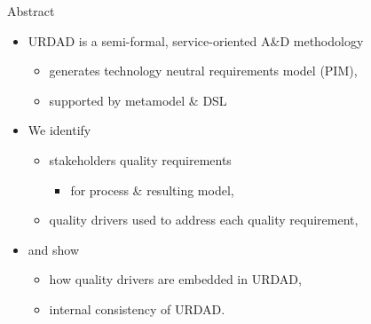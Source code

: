 
\begin{frame}{Abstract}
\initclock

  \begin{itemize}
   \item<+-| alert@+> URDAD is a semi-formal, service-oriented A\&D methodology 
      \begin{itemize}
	\item generates technology neutral requirements model (PIM),
	\item supported by metamodel \& DSL
      \end{itemize}
    \item<+-| alert@+> We identify
    \begin{itemize}
    \item stakeholders quality requirements 
	\begin{itemize}
	  \item for process \& resulting model,
	\end{itemize}
    \item quality drivers used to address each quality requirement,
    \end{itemize}
      \item<+-| alert@+> and show
      \begin{itemize}
	\item how quality drivers are embedded in URDAD,
	\item internal consistency of URDAD.
      \end{itemize}
  \end{itemize}

\end{frame}
